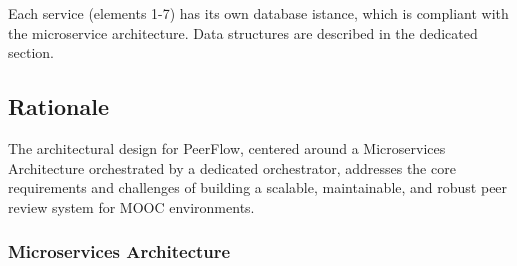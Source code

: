 \begin{justify}
   Each service (elements 1-7) has its own database istance, which is compliant with the microservice architecture. Data structures are described in the dedicated section. 
\end{justify}

\subsection{Rationale}

\begin{justify}
    The architectural design for PeerFlow, centered around a Microservices Architecture orchestrated by a dedicated orchestrator, addresses the core requirements and challenges of building a scalable, maintainable, and robust peer review system for MOOC environments.
\end{justify}

\subsubsection{Microservices Architecture}

